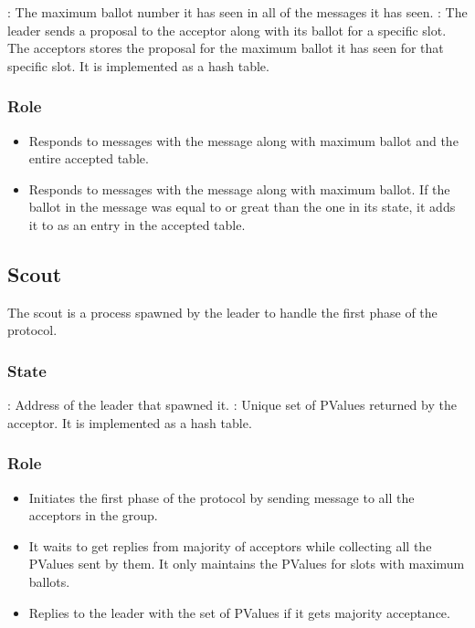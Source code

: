\begin{itemize}
    : The maximum ballot number it has seen in all
    of the messages it has seen.
    : The leader sends a proposal to the acceptor along with
    its ballot for a specific slot. The acceptors stores the proposal for
    the maximum ballot it has seen for that specific slot. It is implemented as
    a hash table.
\end{itemize}

\subsubsection{Role}

\begin{itemize}
  \item Responds to  messages with the  message
    along with maximum ballot and the entire accepted table.
  \item Responds to  messages with the  message
    along with maximum ballot. If the ballot in the  message
    was equal to or great than the one in its state, it adds it to as
    an entry in the accepted table.
\end{itemize}


\subsection{Scout}

The scout is a process spawned by the leader to handle the first phase of the
protocol.

\subsubsection{State}
\label{section:scout.state}

\begin{itemize}
    : Address of the leader that spawned it.
    :%
    Unique set of PValues returned by the acceptor. It is implemented as a
    hash table.
\end{itemize}

\subsubsection{Role}

\begin{itemize}
  \item Initiates the first phase of the protocol by sending 
    message to all the acceptors in the group.
  \item It waits to get replies from majority of acceptors while collecting
    all the PValues sent by them. It only maintains the PValues for slots
    with maximum ballots.
  \item Replies to the leader with the set of PValues if it gets majority
    acceptance.
\end{itemize}


